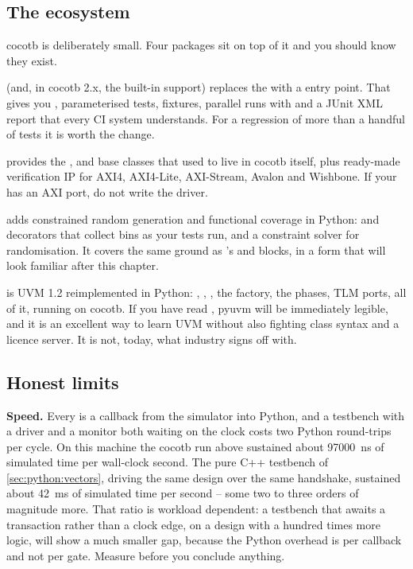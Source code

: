 \subsection{The ecosystem}

cocotb is deliberately small. Four packages sit on top of it and you should
know they exist.

 (and, in cocotb 2.x, the built-in  support)
replaces the  with a  entry point. That gives you
, parameterised tests, fixtures, parallel runs with
 and a JUnit XML report that every CI system understands.
For a regression of more than a handful of tests it is worth the change.

 provides the ,  and
 base classes that used to live in cocotb itself, plus
ready-made verification IP for AXI4, AXI4-Lite, AXI-Stream, Avalon and
Wishbone. If your \DUT{} has an AXI port, do not write the driver.

 adds constrained random generation and functional
coverage in Python:  and  decorators that
collect bins as your tests run, and a constraint solver for randomisation.
It covers the same ground as \SV{}'s  and 
blocks, in a form that will look familiar after this chapter.

 is UVM 1.2 reimplemented in Python: ,
, , the factory, the phases, TLM
ports, all of it, running on cocotb. If you have read , pyuvm
will be immediately legible, and it is an excellent way to learn UVM without
also fighting \SV{} class syntax and a licence server. It is not, today, what
industry signs off with.

\subsection{Honest limits}

\textbf{Speed.} Every  is a callback from the
simulator into Python, and a testbench with a driver and a monitor both
waiting on the clock costs two Python round-trips per cycle. On this machine
the cocotb run above sustained about \SI{97000}{ns} of simulated time per
wall-clock second. The pure C++  testbench of
\cref{sec:python:vectors}, driving the same design over the same handshake,
sustained about \SI{42}{\milli\second} of simulated time per second -- some
two to three orders of magnitude more. That ratio is workload dependent: a
testbench that awaits a transaction rather than a clock edge, on a design
with a hundred times more logic, will show a much smaller gap, because the
Python overhead is per callback and not per gate. Measure before you conclude
anything.

